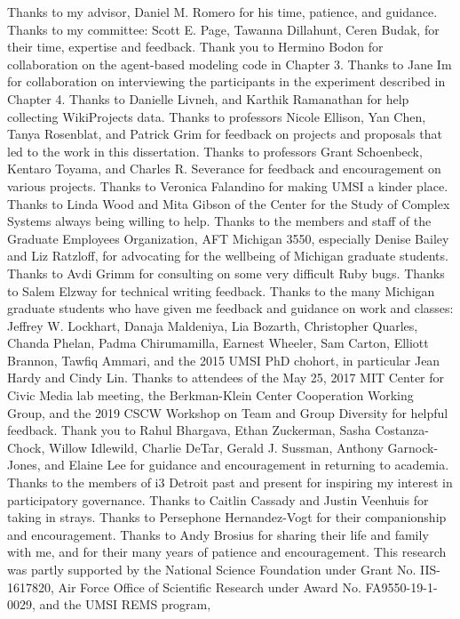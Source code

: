 Thanks to my advisor, Daniel M. Romero for his time, patience, and guidance.
Thanks to my committee:
Scott E. Page,
Tawanna Dillahunt,
Ceren Budak,
for their time, expertise and feedback.
Thank you to Hermino Bodon for collaboration on the agent-based modeling code in Chapter 3.
Thanks to Jane Im for collaboration on interviewing the participants in the experiment described in Chapter 4.
Thanks to Danielle Livneh, and Karthik Ramanathan for help collecting WikiProjects data.
Thanks to professors Nicole Ellison, Yan Chen, Tanya Rosenblat, and Patrick Grim for feedback on projects and proposals that led to the work in this dissertation.
Thanks to professors Grant Schoenbeck, Kentaro Toyama, and Charles R. Severance for feedback and encouragement on various projects.
Thanks to Veronica Falandino for making UMSI a kinder place.
Thanks to Linda Wood and Mita Gibson of the Center for the Study of Complex Systems always being willing to help.
Thanks to the members and staff of the Graduate Employees Organization, AFT Michigan 3550, especially Denise Bailey and Liz Ratzloff, for advocating for the wellbeing of Michigan graduate students.
Thanks to Avdi Grimm for consulting on some very difficult Ruby bugs.
Thanks to Salem Elzway for technical writing feedback.
Thanks to the many Michigan graduate students who have given me feedback and guidance on work and classes:
Jeffrey W. Lockhart,
Danaja Maldeniya,
Lia Bozarth,
Christopher Quarles,
Chanda Phelan,
Padma Chirumamilla,
Earnest Wheeler,
Sam Carton,
Elliott Brannon,
Tawfiq Ammari,
and the 2015 UMSI PhD chohort,
in particular Jean Hardy and Cindy Lin.
Thanks to attendees of the May 25, 2017 MIT Center for Civic Media lab meeting,
the Berkman-Klein Center Cooperation Working Group,
and the 2019 CSCW Workshop on Team and Group Diversity
for helpful feedback.
Thank you to
Rahul Bhargava,
Ethan Zuckerman,
Sasha Costanza-Chock,
Willow Idlewild,
Charlie DeTar,
Gerald J. Sussman,
Anthony Garnock-Jones,
and Elaine Lee
for guidance and encouragement in returning to academia.
Thanks to the members of i3 Detroit past and present for inspiring my interest in participatory governance.
Thanks to Caitlin Cassady and Justin Veenhuis for taking in strays.
Thanks to Persephone Hernandez-Vogt for their companionship and encouragement.
Thanks to Andy Brosius for sharing their life and family with me, and for their many years of patience and encouragement.
This research was partly supported by
the National Science Foundation under Grant No. IIS-1617820,
Air Force Office of Scientific Research under Award No. FA9550-19-1-0029,
and the UMSI REMS program,
